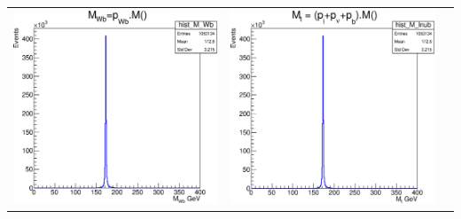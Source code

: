 \documentclass[10pt]{beamer}
\begin{document}
\begin{frame}
\begin{center}
\begin{tabular}{ccc}
\includegraphics[scale=0.18]{plot-mWb-gen.eps}&
	\includegraphics[scale=0.18]{plot-mtop-reco.eps} 
	
	

\end{tabular}
\end{center}
\end{frame}
\end{document}
